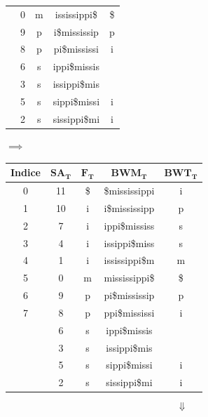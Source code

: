 \begin{esempio}
\begin{table}[H]
\begin{tabular}{c|c|c|c|c}
      {\color{nordred}{5}} & 0 & m & {\color{nordred}{m}}ississippi\$ & \$\\
      {\color{nordred}{6}} & 9 & p & {\color{nordred}{p}}i\$mississip & p\\
      {\color{nordred}{7}} & 8 & p & {\color{nordred}{p}}pi\$mississi & i\\
      {\color{nordred}{8}} & 6 & s & {\color{nordred}{s}}ippi\$missis
      & {\color{nordgreen}{s}}\\
      {\color{nordred}{9}} & 3 & s & {\color{nordred}{s}}issippi\$mis
      & {\color{nordgreen}{s}}\\
      {\color{nordred}{10}} & 5 & s & {\color{nordred}{s}}sippi\$missi & i\\
      {\color{nordred}{11}} & 2 & s & {\color{nordred}{s}}sissippi\$mi & i\\
    \end{tabular}
    $\implies$
    \begin{tabular}{c|c|c|c|c} 
      \textbf{Indice} & $\mathbf{SA_T}$ & $\mathbf{F_T}$ & $\mathbf{BWM_T}$
      & $\mathbf{BWT_T}$\\ 
      \hline
      0 & 11 & \$ & \$mississippi & i\\
      1 & 10 & i & i\$mississipp & p\\
      2 & 7 & i & ippi\$mississ & s\\
      3 & 4 & i & issippi\$miss & s\\
      4 & 1 & i & ississippi\$m & m\\
      5 & 0 & m & mississippi\$ & \$\\
      6 & 9 & p & pi\$mississip & p\\
      7 & 8 & p & ppi\$mississi & i\\
      {\color{nordred}{8}} & 6 & s & {\color{nordred}{s}}ippi\$missis
      & {\color{nordgreen}{s}}\\
      {\color{nordred}{9}} & 3 & s & {\color{nordred}{s}}issippi\$mis
      & {\color{nordgreen}{s}}\\
      {\color{nordred}{10}} & 5 & s & {\color{nordred}{s}}sippi\$missi & i\\
      {\color{nordred}{11}} & 2 & s & {\color{nordred}{s}}sissippi\$mi & i\\
    \end{tabular}
  \end{table}
  \[\Downarrow\]
  \begin{table}[H]
    \centering
    \scriptsize
    \begin{tabular}{c|c|c|c|c} 

\end{tabular}
\end{table}
\end{esempio}

